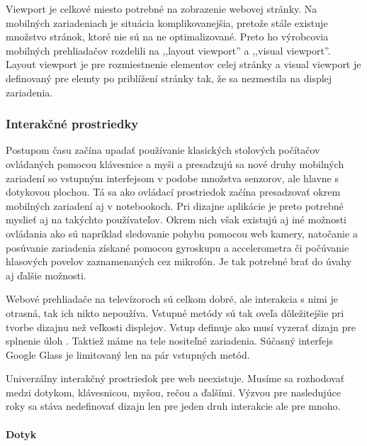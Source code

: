 Viewport je celkové miesto potrebné na zobrazenie webovej stránky. Na mobilných zariadeniach je situácia komplikovanejšia, pretože stále existuje množstvo stránok, ktoré nie sú na ne optimalizované. Preto ho výrobcovia mobilných prehliadačov rozdelili na ,,layout viewport'' a ,,visual viewport''. \cite{pixelnotpixel} Layout viewport je pre rozmiestnenie elementov celej stránky a visual viewport je definovaný pre elemty po priblížení stránky tak, že sa nezmestila na displej zariadenia.


\subsubsection{Interakčné prostriedky} %
\label{ssub:interak_n_prostriedky}

Postupom času začína upadať používanie klasických stolových počítačov ovládaných pomocou klávesnice a myši a presadzujú sa nové druhy mobilných zariadení so vstupným interfejsom v podobe množstva senzorov, ale hlavne s dotykovou plochou. Tá sa ako ovládací prostriedok začína presadzovať okrem mobilných zariadení aj v notebookoch. Pri dizajne aplikácie je preto potrebné myslieť aj na takýchto používateľov. Okrem nich však existujú aj iné možnosti ovládania ako sú napríklad sledovanie pohybu pomocou web kamery, natočanie a posúvanie zariadenia získané pomocou gyroskupu a accelerometra či počúvanie hlasových povelov zaznamenaných cez mikrofón. Je tak potrebné brať do úvahy aj ďalšie možnosti.

Webové prehliadače na televízoroch sú celkom dobré, ale interakcia s nimi je otrasná, tak ich nikto nepoužíva. Vstupné metódy sú tak oveľa dôležitejšie pri tvorbe dizajnu než veľkosti displejov. Vstup definuje ako musí vyzerať dizajn pre splnenie úloh \cite{adaptiveinput}. Taktiež máme na tele nositeľné zariadenia. Súčasný interfejs Google Glass je limitovaný len na pár vstupných metód.

Univerzálny interakčný prostriedok pre web neexistuje. Musíme sa rozhodovať medzi dotykom, klávesnicou, myšou, rečou a ďalšími. Výzvou pre nasledujúce roky sa stáva nedefinovať dizajn len pre jeden druh interakcie ale pre mnoho.


\paragraph{Dotyk} %

